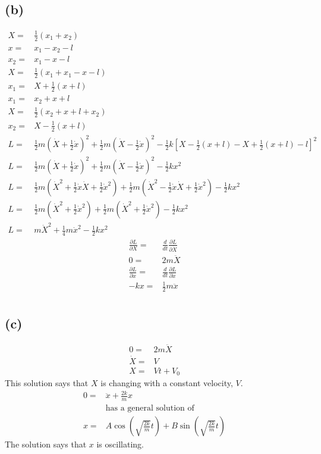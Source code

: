 \documentclass[12pt, a4paper]{article}
\begin{document}
\subsection{(b)}
\begin{align*}
X =& \tfrac{1}{2}(x_1 + x_2)
\\
x =& x_1-x_2-l
\\
x_2 =& x_1-x-l
\\
X =& \tfrac{1}{2}(x_1 + x_1-x-l)
\\
x_1 =& \boxed{X + \tfrac{1}{2}(x+l)}
\\
x_1 =& x_2+x+l
\\
X =& \tfrac{1}{2}(x_2 + x + l + x_2)
\\
x_2 =& \boxed{X - \tfrac{1}{2}(x + l)}
\\
L =& 
\tfrac{1}{2}m(\dot{X} + \tfrac{1}{2}\dot{x})^2 + 
\tfrac{1}{2}m(\dot{X} - \tfrac{1}{2}\dot{x})^2 - 
\tfrac{1}{2}k[X - \tfrac{1}{2}(x + l)- X + \tfrac{1}{2}(x + l) - l]^2
\\
L =& 
\tfrac{1}{2}m(\dot{X} + \tfrac{1}{2}\dot{x})^2 + 
\tfrac{1}{2}m(\dot{X} - \tfrac{1}{2}\dot{x})^2 - 
\tfrac{1}{2}kx^2
\\
L =& 
\tfrac{1}{2}m(\dot{X}^2 + \tfrac{1}{2}\dot{x}\dot{X} + \tfrac{1}{2}\dot{x}^2) + 
\tfrac{1}{2}m(\dot{X}^2 - \tfrac{1}{2}\dot{x}\dot{X} + \tfrac{1}{2}\dot{x}^2) - 
\tfrac{1}{2}kx^2
\\
L =& 
\tfrac{1}{2}m(\dot{X}^2 + \tfrac{1}{2}\dot{x}^2) + 
\tfrac{1}{2}m(\dot{X}^2 + \tfrac{1}{2}\dot{x}^2) - 
\tfrac{1}{2}kx^2
\\
L =& \boxed{m\dot{X}^2 + \tfrac{1}{4}m\dot{x}^2 - \tfrac{1}{2}kx^2}
\end{align*}
\begin{align*}
\frac{\partial L}{\partial X} =& \frac{d}{dt}\frac{\partial L}{\partial\dot{X}}
\\
0 =& 2m\ddot{X}
\\
\frac{\partial L}{\partial x} =& \frac{d}{dt}\frac{\partial L}{\partial\dot{x}}
\\
-kx =& \frac{1}{2}m\ddot{x}
\\
\end{align*}
\subsection{(c)}
\begin{align}
0 =& 2m\ddot{X}
\\
\dot{X} =& V
\\
X =& Vt + V_0
\end{align}
This solution says that $X$ is changing with a constant velocity, $V$.
\begin{align*}
0 =& \ddot{x} + \frac{2k}{m}x
\\
&\text{has a general solution of}
\\
x =& A\cos\left(\sqrt{\frac{2k}{m}}t\right) + B\sin\left(\sqrt{\frac{2k}{m}}t\right)
\end{align*}
The solution says that $x$ is oscillating.
\end{document}
